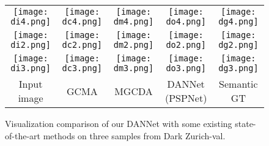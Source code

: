 \documentclass[final]{cvpr}
\begin{document}
\begin{figure*}[h]\small
	\begin{center}
		\begin{tabular}{ccccc}
			\hspace{-.21cm}
			\texttt{[image: di4.png]} & \hspace{-.45cm}
			\texttt{[image: dc4.png]} & \hspace{-.45cm}
			\texttt{[image: dm4.png]} & \hspace{-.45cm}
			\texttt{[image: do4.png]} & \hspace{-.45cm}
			\texttt{[image: dg4.png]} \vspace{-.05cm} \\
			\hspace{-.21cm}
			\texttt{[image: di2.png]} & \hspace{-.45cm}
			\texttt{[image: dc2.png]} & \hspace{-.45cm}
			\texttt{[image: dm2.png]} & \hspace{-.45cm}
			\texttt{[image: do2.png]} & \hspace{-.45cm}
			\texttt{[image: dg2.png]} \vspace{-.05cm} \\
			\hspace{-.21cm}
			\texttt{[image: di3.png]} & \hspace{-.45cm}
			\texttt{[image: dc3.png]} & \hspace{-.45cm}
			\texttt{[image: dm3.png]} & \hspace{-.45cm}
			\texttt{[image: do3.png]} & \hspace{-.45cm}
			\texttt{[image: dg3.png]} \vspace{-.05cm} \\
			\hspace{-.21cm}
			Input image   & \hspace{-.45cm}  GCMA \cite{sakaridis2019guided}  & \hspace{-.45cm} MGCDA \cite{sakaridis2020map}  & \hspace{-.45cm} DANNet (PSPNet) & \hspace{-.45cm} Semantic GT \\
		\end{tabular}
		\vspace{1pt}
		\caption{Visualization comparison of our DANNet with some existing  state-of-the-art methods on three samples from Dark Zurich-val.}
		\label{fig_comparison}
	\end{center}
	\vspace{-7pt}
\end{figure*}
\end{document}
